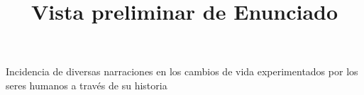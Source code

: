 \documentclass[a4paper,12pt]{article}\usepackage[utf8]{inputenc}\usepackage[spanish]{babel}\usepackage{times}
\title{Vista preliminar de Enunciado}
\begin{document}
\twocolumn 

\maketitle

Incidencia de diversas narraciones en los  cambios de vida experimentados por los seres humanos a través de su historia
\end{document}
